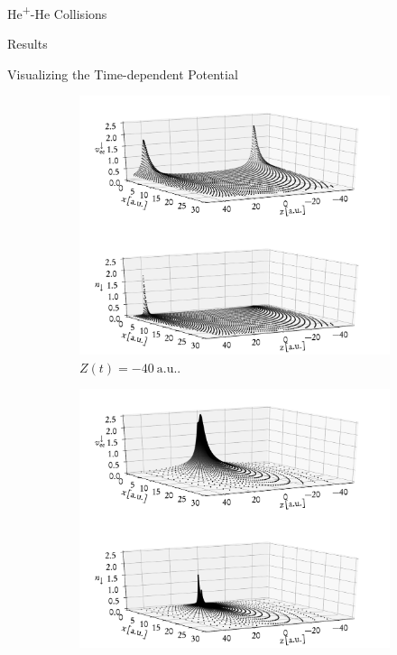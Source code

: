 \documentclass[a5paper, 9 pt]{extreport}
\begin{document}
\begin{chapter}{\texorpdfstring{He\textsuperscript{+}}{He+}-He Collisions \label{chap:hephe}}
\begin{section}{Results \label{sec:hephe-disc}}
\begin{subsection}{Visualizing the Time-dependent Potential \label{sec:visual}}
         \begin{figure}[b]
            \centering
            \begin{subfigure}{.49\textwidth}
               \centering
               \includegraphics[width=\linewidth]{./images/frames/vee-dn-E50-b1-initial.pdf}
               \caption{$Z(t) = -40~\mathrm{a.u.}$. \label{fig:dnI}}
            \end{subfigure}
            \begin{subfigure}{.49\textwidth}
               \centering
               \includegraphics[width=\linewidth]{./images/frames/vee-dn-E50-b1-closest.pdf}

\end{subfigure}
\end{figure}
\end{subsection}
\end{section}
\end{chapter}
\end{document}
